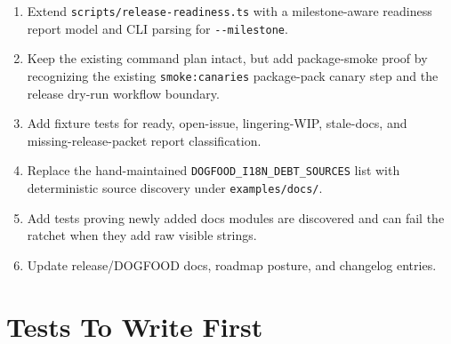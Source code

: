 \begin{enumerate}
\def\labelenumi{\arabic{enumi}.}
\tightlist
\item
  Extend \texttt{s\allowbreak{}c\allowbreak{}r\allowbreak{}i\allowbreak{}p\allowbreak{}t\allowbreak{}s\allowbreak{}/\allowbreak{}r\allowbreak{}e\allowbreak{}l\allowbreak{}e\allowbreak{}a\allowbreak{}s\allowbreak{}e\allowbreak{}-\allowbreak{}r\allowbreak{}e\allowbreak{}a\allowbreak{}d\allowbreak{}i\allowbreak{}n\allowbreak{}e\allowbreak{}s\allowbreak{}s\allowbreak{}.\allowbreak{}t\allowbreak{}s} with a milestone-aware readiness report model and CLI parsing for \texttt{-\allowbreak{}-\allowbreak{}m\allowbreak{}i\allowbreak{}l\allowbreak{}e\allowbreak{}s\allowbreak{}t\allowbreak{}o\allowbreak{}n\allowbreak{}e}.
\item
  Keep the existing command plan intact, but add package-smoke proof by recognizing the existing \texttt{s\allowbreak{}m\allowbreak{}o\allowbreak{}k\allowbreak{}e\allowbreak{}:\allowbreak{}c\allowbreak{}a\allowbreak{}n\allowbreak{}a\allowbreak{}r\allowbreak{}i\allowbreak{}e\allowbreak{}s} package-pack canary step and the release dry-run workflow boundary.
\item
  Add fixture tests for ready, open-issue, lingering-WIP, stale-docs, and missing-release-packet report classification.
\item
  Replace the hand-maintained \texttt{D\allowbreak{}O\allowbreak{}G\allowbreak{}F\allowbreak{}O\allowbreak{}O\allowbreak{}D\allowbreak{}\_\allowbreak{}I\allowbreak{}1\allowbreak{}8\allowbreak{}N\allowbreak{}\_\allowbreak{}D\allowbreak{}E\allowbreak{}B\allowbreak{}T\allowbreak{}\_\allowbreak{}S\allowbreak{}O\allowbreak{}U\allowbreak{}R\allowbreak{}C\allowbreak{}E\allowbreak{}S} list with deterministic source discovery under \texttt{e\allowbreak{}x\allowbreak{}a\allowbreak{}m\allowbreak{}p\allowbreak{}l\allowbreak{}e\allowbreak{}s\allowbreak{}/\allowbreak{}d\allowbreak{}o\allowbreak{}c\allowbreak{}s\allowbreak{}/}.
\item
  Add tests proving newly added docs modules are discovered and can fail the ratchet when they add raw visible strings.
\item
  Update release/DOGFOOD docs, roadmap posture, and changelog entries.
\end{enumerate}

\section{Tests To Write First}\label{record-214-tests-to-write-first}

